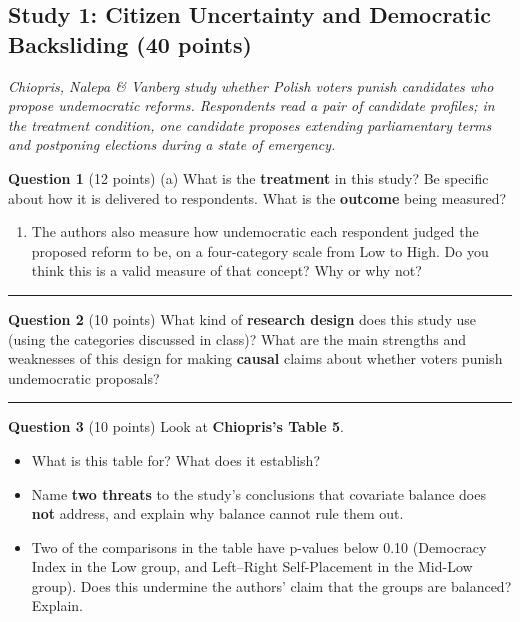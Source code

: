 \documentclass[
]{article}
\providecommand{\tightlist}{%
  \setlength{\itemsep}{0pt}\setlength{\parskip}{0pt}}
\begin{document}
\subsection{Study 1: Citizen Uncertainty and Democratic Backsliding (40
points)}\label{study-1-citizen-uncertainty-and-democratic-backsliding-40-points}

\emph{Chiopris, Nalepa \& Vanberg study whether Polish voters punish
candidates who propose undemocratic reforms. Respondents read a pair of
candidate profiles; in the treatment condition, one candidate proposes
extending parliamentary terms and postponing elections during a state of
emergency.}

\textbf{Question 1} (12 points) (a) What is the \textbf{treatment} in
this study? Be specific about how it is delivered to respondents. What
is the \textbf{outcome} being measured?

\begin{enumerate}
\def\labelenumi{(\alph{enumi})}
\setcounter{enumi}{1}
\tightlist
\item
  The authors also measure how undemocratic each respondent judged the
  proposed reform to be, on a four-category scale from Low to High. Do
  you think this is a valid measure of that concept? Why or why not?
\end{enumerate}

\vspace{4cm}

\begin{center}\rule{0.5\linewidth}{0.5pt}\end{center}

\textbf{Question 2} (10 points) What kind of \textbf{research design}
does this study use (using the categories discussed in class)? What are
the main strengths and weaknesses of this design for making
\textbf{causal} claims about whether voters punish undemocratic
proposals?

\vspace{4cm}

\begin{center}\rule{0.5\linewidth}{0.5pt}\end{center}

\textbf{Question 3} (10 points) Look at \textbf{Chiopris's Table 5}.

\begin{itemize}
\tightlist
\item
  What is this table for? What does it establish?
\item
  Name \textbf{two threats} to the study's conclusions that covariate
  balance does \textbf{not} address, and explain why balance cannot rule
  them out.
\item
  Two of the comparisons in the table have p-values below 0.10
  (Democracy Index in the Low group, and Left--Right Self-Placement in
  the Mid-Low group). Does this undermine the authors' claim that the
  groups are balanced? Explain.
\end{itemize}
\end{document}
